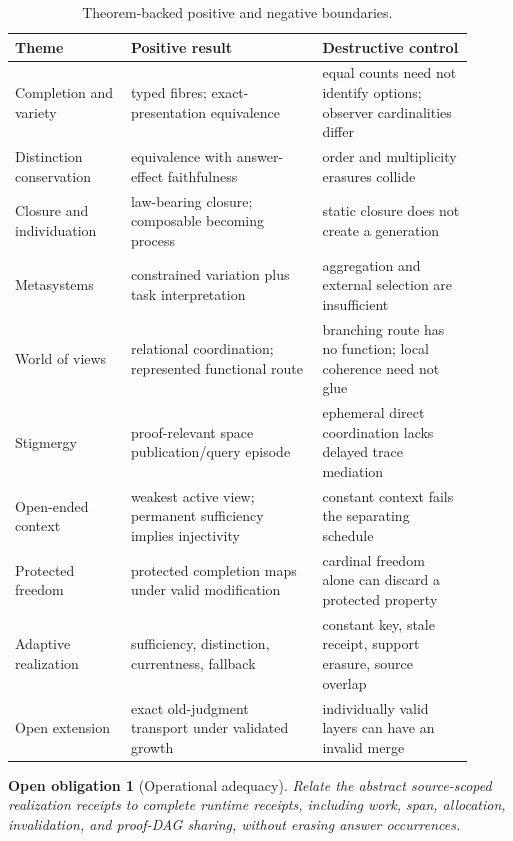 \documentclass[11pt]{article}
\newtheorem{obligation}[theorem]{Open obligation}
\begin{document}
\begin{table}[ht]
\centering
\small
\begin{tabular}{p{0.23\linewidth}p{0.38\linewidth}p{0.30\linewidth}}
\toprule
Theme & Positive result & Destructive control \\
\midrule
Completion and variety & typed fibres; exact-presentation equivalence & equal counts need not identify options; observer cardinalities differ \\
Distinction conservation & equivalence with answer-effect faithfulness & order and multiplicity erasures collide \\
Closure and individuation & law-bearing closure; composable becoming process & static closure does not create a generation \\
Metasystems & constrained variation plus task interpretation & aggregation and external selection are insufficient \\
World of views & relational coordination; represented functional route & branching route has no function; local coherence need not glue \\
Stigmergy & proof-relevant space publication/query episode & ephemeral direct coordination lacks delayed trace mediation \\
Open-ended context & weakest active view; permanent sufficiency implies injectivity & constant context fails the separating schedule \\
Protected freedom & protected completion maps under valid modification & cardinal freedom alone can discard a protected property \\
Adaptive realization & sufficiency, distinction, currentness, fallback & constant key, stale receipt, support erasure, source overlap \\
Open extension & exact old-judgment transport under validated growth & individually valid layers can have an invalid merge \\
\bottomrule
\end{tabular}
\caption{Theorem-backed positive and negative boundaries.}
\label{tab:formal-map}
\end{table}

\begin{obligation}[Operational adequacy]
Relate the abstract source-scoped realization receipts to complete runtime receipts,
including work, span, allocation, invalidation, and proof-DAG sharing, without erasing
answer occurrences.
\end{obligation}
\end{document}
